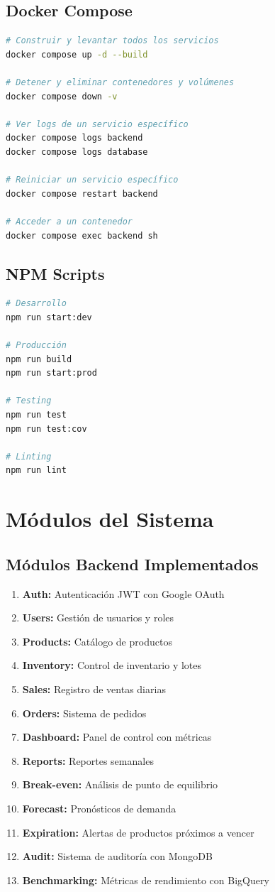 \documentclass[12pt,a4paper]{article}
\begin{document}
\subsection{Docker Compose}
\begin{lstlisting}[language=bash,caption=Comandos principales de Docker]
# Construir y levantar todos los servicios
docker compose up -d --build

# Detener y eliminar contenedores y volúmenes
docker compose down -v

# Ver logs de un servicio específico
docker compose logs backend
docker compose logs database

# Reiniciar un servicio específico
docker compose restart backend

# Acceder a un contenedor
docker compose exec backend sh
\end{lstlisting}

\subsection{NPM Scripts}
\begin{lstlisting}[language=bash,caption=Scripts disponibles en backend]
# Desarrollo
npm run start:dev

# Producción
npm run build
npm run start:prod

# Testing
npm run test
npm run test:cov

# Linting
npm run lint
\end{lstlisting}

\section{Módulos del Sistema}

\subsection{Módulos Backend Implementados}
\begin{enumerate}
\item \textbf{Auth:} Autenticación JWT con Google OAuth
\item \textbf{Users:} Gestión de usuarios y roles
\item \textbf{Products:} Catálogo de productos
\item \textbf{Inventory:} Control de inventario y lotes
\item \textbf{Sales:} Registro de ventas diarias
\item \textbf{Orders:} Sistema de pedidos
\item \textbf{Dashboard:} Panel de control con métricas
\item \textbf{Reports:} Reportes semanales
\item \textbf{Break-even:} Análisis de punto de equilibrio
\item \textbf{Forecast:} Pronósticos de demanda
\item \textbf{Expiration:} Alertas de productos próximos a vencer
\item \textbf{Audit:} Sistema de auditoría con MongoDB
\item \textbf{Benchmarking:} Métricas de rendimiento con BigQuery
\end{enumerate}
\end{document}
